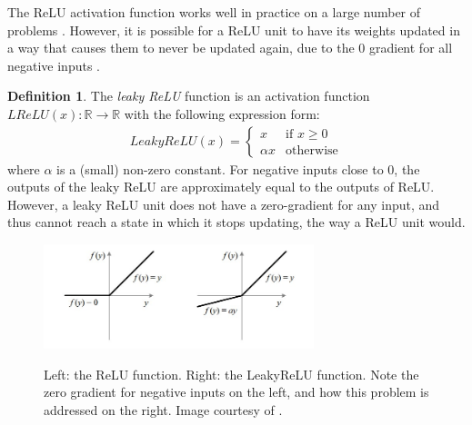 \documentclass[12pt, titlepage]{report}
\theoremstyle{definition}
\newtheorem{definition}{Definition}
\begin{document}
The ReLU activation function works well in practice on a large number of problems \cite[Neural Networks Part 1: Setting up the Architecture]{karpathy2017cs231n}. However, it is possible for a ReLU unit to have its weights updated in a way that causes them to never be updated again, due to the 0 gradient for all negative inputs \cite[Neural Networks Part 1: Setting up the Architecture]{karpathy2017cs231n}. 

\begin{definition}
The \emph{leaky ReLU} function is an activation function $LReLU(x) : \mathbb{R} \rightarrow \mathbb{R}$ with the following expression form:
\begin{gather}\label{eq:leakyrelu}
LeakyReLU(x) = 
\begin{cases}
    x 							 & \text{if } x\geq 0\\
    \alpha{x}             & \text{otherwise}
\end{cases}
\end{gather}
where $\alpha$ is a (small) non-zero constant. For negative inputs close to 0, the outputs of the leaky ReLU are approximately equal to the outputs of ReLU. However, a leaky ReLU unit does not have a zero-gradient for any input, and thus cannot reach a state in which it stops updating, the way a ReLU unit would\cite[Neural Networks Part 1: Setting up the Architecture]{karpathy2017cs231n}.
\end{definition}

\begin{figure}
\centering
\includegraphics[width=0.7\textwidth]{img/relu.jpg}\\
\caption[ReLU and LeakyRelu activations]{Left: the ReLU function. Right: the LeakyReLU function. Note the zero gradient for negative inputs on the left, and how this problem is addressed on the right. Image courtesy of \cite{sharma2017activation}.}
\label{figure:relu}
\end{figure}
\end{document}

